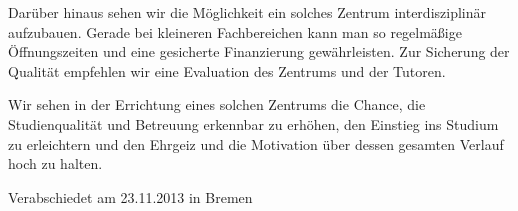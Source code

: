 \documentclass[DIV=calc]{scrartcl}
\begin{document}
Darüber hinaus sehen wir die Möglichkeit ein solches Zentrum interdisziplinär aufzubauen. Gerade bei kleineren Fachbereichen kann man so regelmäßige Öffnungszeiten und eine gesicherte Finanzierung gewährleisten. 
Zur Sicherung der Qualität empfehlen wir eine Evaluation des Zentrums und der Tutoren. 

Wir sehen in der Errichtung eines solchen Zentrums die Chance, die Studienqualität und Betreuung erkennbar zu erhöhen, den Einstieg ins Studium zu erleichtern und den Ehrgeiz und die Motivation über dessen gesamten Verlauf hoch zu halten.




\vfill
\begin{flushright}
Verabschiedet am 23.11.2013 in Bremen
\end{flushright}
\end{document}
